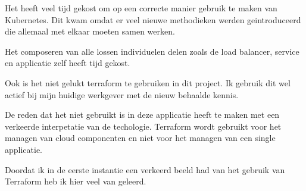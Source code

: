 {{{			Het heeft veel tijd gekost om op een correcte manier gebruik te maken van Kubernetes.
			Dit kwam omdat er veel nieuwe methodieken werden geintroduceerd die allemaal met elkaar moeten samen werken.

			Het composeren van alle lossen individuelen delen zoals de load balancer, service en applicatie zelf heeft tijd gekost.

			Ook is het niet gelukt terraform te gebruiken in dit project.
			Ik gebruik dit wel actief bij mijn huidige werkgever met de nieuw behaalde kennis.


			De reden dat het niet gebruikt is in deze applicatie heeft te maken met een verkeerde interpetatie van de techologie.
			Terraform wordt gebruikt voor het managen van cloud componenten en niet voor het managen van een single applicatie.

			Doordat ik in de eerste instantie een verkeerd beeld had van het gebruik van Terraform heb ik hier veel van geleerd.
		}

}}
